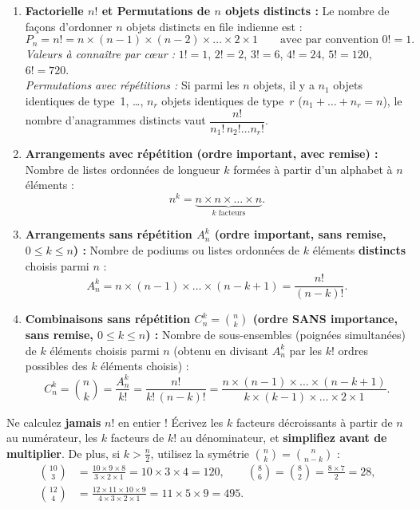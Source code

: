 \begin{theoreme}
\begin{enumerate}
    \item \textbf{Factorielle $n!$ et Permutations de $n$ objets distincts :} Le nombre de façons d'ordonner $n$ objets distincts en file indienne est :
    \[
        \boxed{P_n = n! = n \times (n-1) \times (n-2) \times \dots \times 2 \times 1} \qquad \text{avec par convention } \boxed{0! = 1}.
    \]
    \emph{Valeurs à connaître par cœur :} $1! = 1$, $2! = 2$, $3! = 6$, $4! = 24$, $5! = 120$, $6! = 720$.\\
    \emph{Permutations avec répétitions :} Si parmi les $n$ objets, il y a $n_1$ objets identiques de type~1, \dots, $n_r$ objets identiques de type~$r$ ($n_1 + \dots + n_r = n$), le nombre d'anagrammes distincts vaut $\dfrac{n!}{n_1!\,n_2!\dots n_r!}$.
    \item \textbf{Arrangements avec répétition (ordre important, avec remise) :} Nombre de listes ordonnées de longueur $k$ formées à partir d'un alphabet à $n$ éléments :
    \[
        \boxed{n^k = \underbrace{n \times n \times \dots \times n}_{k \text{ facteurs}}}.
    \]
    \item \textbf{Arrangements sans répétition $A_n^k$ (ordre important, sans remise, $0 \le k \le n$) :} Nombre de podiums ou listes ordonnées de $k$ éléments \textbf{distincts} choisis parmi $n$ :
    \[
        \boxed{A_n^k = n \times (n-1) \times \dots \times (n - k + 1) = \frac{n!}{(n - k)!}}.
    \]
    \item \textbf{Combinaisons sans répétition $C_n^k = \binom{n}{k}$ (ordre SANS importance, sans remise, $0 \le k \le n$) :} Nombre de sous-ensembles (poignées simultanées) de $k$ éléments choisis parmi $n$ (obtenu en divisant $A_n^k$ par les $k!$ ordres possibles des $k$ éléments choisis) :
    \[
        \boxed{C_n^k = \binom{n}{k} = \frac{A_n^k}{k!} = \frac{n!}{k!\,(n - k)!} = \frac{n \times (n-1) \times \dots \times (n - k + 1)}{k \times (k-1) \times \dots \times 2 \times 1}}.
    \]
\end{enumerate}
\end{theoreme}

\begin{astuce}
Ne calculez \textbf{jamais} $n!$ en entier ! Écrivez les $k$ facteurs décroissants à partir de $n$ au numérateur, les $k$ facteurs de $k!$ au dénominateur, et \textbf{simplifiez avant de multiplier}. De plus, si $k > \frac{n}{2}$, utilisez la symétrie $\binom{n}{k} = \binom{n}{n-k}$ :
\begin{align*}
    \binom{10}{3} &= \frac{10 \times 9 \times 8}{3 \times 2 \times 1} = 10 \times 3 \times 4 = 120, \qquad \binom{8}{6} = \binom{8}{2} = \frac{8 \times 7}{2} = 28, \\
    \binom{12}{4} &= \frac{12 \times 11 \times 10 \times 9}{4 \times 3 \times 2 \times 1} = 11 \times 5 \times 9 = 495.
\end{align*}
\end{astuce}

